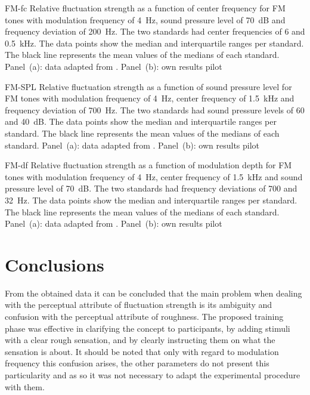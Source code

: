 \documentclass[../main.tex]{subfiles}
\begin{document}
\begin{pilotresults}
\myfigurefastlexpstds%
  {FM-fc}
  {Relative fluctuation strength as a function of center frequency for
    \gls{FM} tones with modulation frequency of 4~Hz, sound pressure level of
    70~dB and frequency deviation of 200~Hz.  The two standards had center
    frequencies of 6 and 0.5~kHz. The data points show the median and
    interquartile ranges per standard. The black line represents the mean values
    of the medians of each standard. Panel~(a): data adapted from
    \cite[pp.250]{Fastl2007Psychoacoustics}. Panel~(b): own results}
  {pilot}

\myfigurefastlexpstds%
  {FM-SPL}
  {Relative fluctuation strength as a function of sound pressure level for
    \gls{FM} tones with modulation frequency of 4~Hz, center frequency of
    1.5~kHz and frequency deviation of 700~Hz.  The two standards had sound
    pressure levels of 60 and 40~dB. The data points show the median and
    interquartile ranges per standard. The black line represents the mean values
    of the medians of each standard. Panel~(a): data adapted from
    \cite[pp.249]{Fastl2007Psychoacoustics}. Panel~(b): own results}
  {pilot}

\myfigurefastlexpstds%
  {FM-df}
  {Relative fluctuation strength as a function of modulation depth for
    \gls{FM} tones with modulation frequency of 4~Hz, center frequency of
    1.5~kHz and sound pressure level of 70~dB.  The two standards had frequency
    deviations of 700 and 32~Hz. The data points show the median and
    interquartile ranges per standard. The black line represents the mean values
    of the medians of each standard. Panel~(a): data adapted from
    \cite[pp.251]{Fastl2007Psychoacoustics}. Panel~(b): own results}
  {pilot}

\end{pilotresults}

\section{Conclusions}

From the obtained data it can be concluded that the main problem when dealing
with the perceptual attribute of fluctuation strength is its ambiguity and
confusion with the perceptual attribute of roughness. The proposed training
phase was effective in clarifying the concept to participants, by adding stimuli
with a clear rough sensation, and by clearly instructing them on what the
sensation is about. It should be noted that only with regard to modulation
frequency this confusion arises, the other parameters do not present this
particularity and as so it was not necessary to adapt the experimental procedure
with them.
\end{document}
